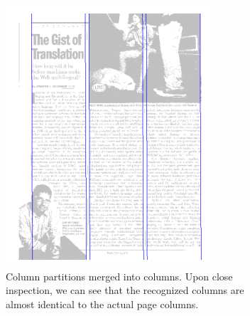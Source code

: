 \begin{figure}[p]
\begin{subfigure}{0.30\textwidth}
\includegraphics[width=\linewidth]{img/tabStopDetection/tessPageSegm4.png}
\caption{Column partitions merged into columns. Upon close inspection, we can see that the recognized columns are almost identical to the actual page columns.}
\label{fig:segmentationTesseract4}
\end{subfigure}
\quad
\begin{subfigure}{0.30\textwidth}

\end{subfigure}
\end{figure}
